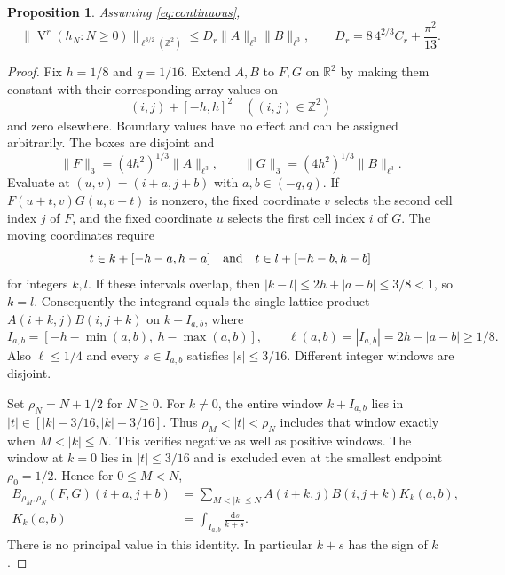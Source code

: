 \documentclass[11pt]{article}
\newtheorem{proposition}[theorem]{Proposition}
\newcommand{\Z}{\mathbb Z}
\newcommand{\R}{\mathbb R}
\newcommand{\dd}{\,\mathrm d}
\DeclareMathOperator{\Var}{V}
\begin{document}
\begin{proposition}\label{prop:discrete}
Assuming \eqref{eq:continuous},
\begin{equation}\label{eq:discrete}
 \|\Var^r(h_N:N\ge0)\|_{\ell^{3/2}(\Z^2)}
 \le D_r\|A\|_{\ell^3}\|B\|_{\ell^3},
 \qquad D_r=8\,4^{2/3}C_r+\frac{\pi^2}{13}.
\end{equation}
\end{proposition}

\begin{proof}
Fix $h=1/8$ and $q=1/16$. Extend $A,B$ to $F,G$ on $\R^2$ by
making them constant with their corresponding array values on
\[
 (i,j)+[-h,h]^2\quad((i,j)\in\Z^2)
\]
and zero elsewhere. Boundary values have no effect and can be assigned
arbitrarily. The boxes are disjoint and
\begin{equation}\label{eq:input-norm}
 \|F\|_3=(4h^2)^{1/3}\|A\|_{\ell^3},\qquad
 \|G\|_3=(4h^2)^{1/3}\|B\|_{\ell^3}.
\end{equation}
Evaluate at $(u,v)=(i+a,j+b)$ with $a,b\in(-q,q)$.
If $F(u+t,v)G(u,v+t)$ is nonzero, the fixed coordinate $v$ selects
the second cell index $j$ of $F$, and the fixed coordinate $u$ selects
the first cell index $i$ of $G$. The moving coordinates require
\[
 t\in k+[-h-a,h-a]\quad\hbox{and}\quad
 t\in l+[-h-b,h-b]
\]
for integers $k,l$. If these intervals overlap, then
$|k-l|\le2h+|a-b|\le3/8<1$, so $k=l$.
Consequently the integrand equals the single lattice product
$A(i+k,j)B(i,j+k)$ on $k+I_{a,b}$, where
\begin{equation}\label{eq:overlap}
 I_{a,b}=[-h-\min(a,b),\ h-\max(a,b)],\qquad
 \ell(a,b)=|I_{a,b}|=2h-|a-b|\ge1/8.
\end{equation}
Also $\ell\le1/4$ and every $s\in I_{a,b}$ satisfies $|s|\le3/16$.
Different integer windows are disjoint.

Set $\rho_N=N+1/2$ for $N\ge0$. For $k\ne0$, the entire window
$k+I_{a,b}$ lies in $|t|\in[|k|-3/16,|k|+3/16]$.
Thus $\rho_M<|t|<\rho_N$ includes that window exactly when
$M<|k|\le N$. This verifies negative as well as positive windows.
The window at $k=0$ lies in $|t|\le3/16$ and is excluded even at
the smallest endpoint $\rho_0=1/2$. Hence for $0\le M<N$,
\begin{equation}\label{eq:kernel-identity}
 \begin{split}
 B_{\rho_M,\rho_N}(F,G)(i+a,j+b)
 &=\sum_{M<|k|\le N}A(i+k,j)B(i,j+k)K_k(a,b),\\
 K_k(a,b)&=\int_{I_{a,b}}\frac{\dd s}{k+s}.
 \end{split}
\end{equation}
There is no principal value in this identity. In particular $k+s$
has the sign of $k$.


\end{proof}
\end{document}

